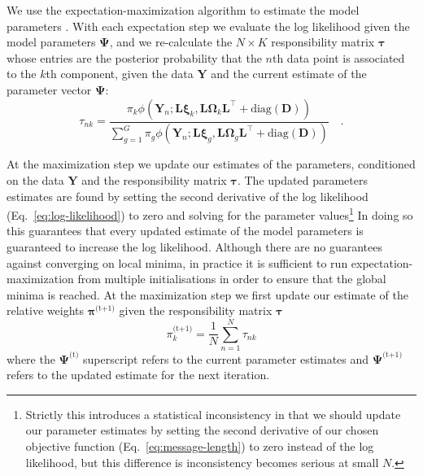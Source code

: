\documentclass[twocolumn]{aastex62}
\newcommand{\vect}[1]{\boldsymbol{\mathbf{#1}}}
\renewcommand{\vec}[1]{\vect{#1}}
\newcommand{\weight}{\pi}
\newcommand{\data}{\textbf{Y}}
\newcommand{\vecdata}{\vec\data}
\newcommand{\diag}[1]{\textrm{diag}(#1)}
\newcommand{\nextstep}{^\textrm{(t+1)}}
\newcommand{\thisstep}{^\textrm{(t)}}
\newcommand{\transpose}{^\intercal}
\newcommand{\factorloads}{\textbf{L}}
\newcommand{\specificvariance}{\vec{D}}
\newcommand{\scoremeans}{\vec\xi}
\newcommand{\scorecovs}{\vec\Omega}
\newcommand{\NumData}{N}
\newcommand{\numdata}{n}
\newcommand{\NumComponents}{K}
\newcommand{\numcomponents}{k}
\begin{document}
We use the expectation-maximization algorithm to estimate the model parameters
\citep{Dempster:1977}. With each expectation step we evaluate the log likelihood 
given the model parameters $\vec\Psi$, and we re-calculate the $\NumData \times \NumComponents$ responsibility 
matrix $\vec\tau$ whose entries are the posterior probability that the 
$\numdata$th data point is associated to the $\numcomponents$th component, given 
the data $\vecdata$ and the current estimate of the parameter vector $\vec\Psi$:
\begin{equation}
	\tau_{\numdata\numcomponents} = \frac{\weight_\numcomponents\phi(\vecdata_\numdata;\factorloads\scoremeans_\numcomponents, \factorloads\scorecovs_\numcomponents\factorloads\transpose + \diag{\specificvariance})}{\sum_{g=1}^{G}\weight_g\phi(\vecdata_\numdata;\factorloads\scoremeans_g, \factorloads\scorecovs_g\factorloads\transpose + \diag{\specificvariance})} \quad .
\end{equation}


At the maximization step we update our estimates of the parameters,
conditioned on the data $\vecdata$ and the responsibility matrix $\vec\tau$.
The updated parameters estimates are found by setting the second derivative
of the log likelihood (Eq.~\ref{eq:log-likelihood}) to zero and solving for
the parameter values\footnote{Strictly this introduces a statistical inconsistency in that we should update our parameter estimates by setting the second derivative of our chosen objective function (Eq.~\ref{eq:message-length}) to zero instead of the log likelihood, but this difference is inconsistency becomes serious at small $N$.}
In doing so this guarantees that every updated
estimate of the model parameters is guaranteed to increase the log likelihood.
Although there are no guarantees against converging on local minima, in 
practice it is sufficient to run expectation-maximization from multiple
initialisations in order to ensure that the global minima is reached.
At the maximization step we first update our estimate of the relative weights 
$\vec\weight\nextstep$ given the responsibility matrix $\vec\tau$
\begin{equation}
	\weight_\numcomponents\nextstep = \frac{1}{\NumData} \sum_{\numdata=1}^{\NumData}\tau_{\numdata\numcomponents}
\end{equation}
\noindent{}where the $\vec{\Psi}\thisstep$ superscript refers to the current parameter estimates and $\vec{\Psi}\nextstep$ refers to the updated estimate for the next iteration.
\end{document}
